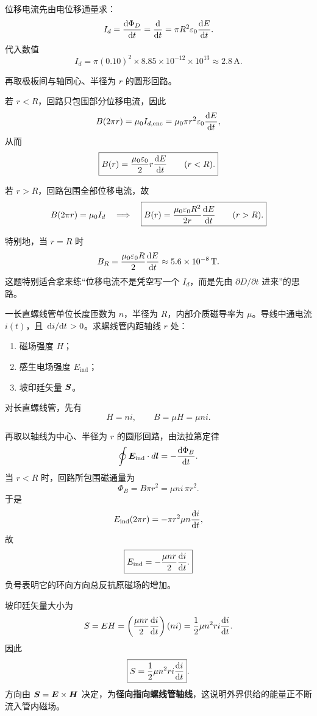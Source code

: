 \documentclass[lang=cn,11pt]{elegantbook}
\begin{document}
\begin{solution}
位移电流先由电位移通量求：
\[
I_d=\dv{\Phi_D}{t}=\dv{}{t}(D\pi R^2)
=\pi R^2\varepsilon_0\dv{E}{t}.
\]
代入数值
\[
I_d=\pi(0.10)^2\times 8.85\times 10^{-12}\times 10^{13}
\approx 2.8\,\mathrm{A}.
\]

再取极板间与轴同心、半径为 \(r\) 的圆形回路。

若 \(r<R\)，回路只包围部分位移电流，因此
\[
B(2\pi r)=\mu_0 I_{d,\mathrm{enc}}
=\mu_0\pi r^2\varepsilon_0\dv{E}{t},
\]
从而
\[
\boxed{
B(r)=\frac{\mu_0\varepsilon_0}{2}r\dv{E}{t}
\qquad (r<R).
}
\]

若 \(r>R\)，回路包围全部位移电流，故
\[
B(2\pi r)=\mu_0I_d
\quad\Longrightarrow\quad
\boxed{
B(r)=\frac{\mu_0\varepsilon_0R^2}{2r}\dv{E}{t}
\qquad (r>R).
}
\]

特别地，当 \(r=R\) 时
\[
B_R=\frac{\mu_0\varepsilon_0R}{2}\dv{E}{t}
\approx 5.6\times 10^{-8}\,\mathrm{T}.
\]
这题特别适合拿来练“位移电流不是凭空写一个 \(I_d\)，而是先由 \(\partial D/\partial t\) 进来”的思路。
\end{solution}

\begin{example}[电流随时间变化的螺线管内的感生电场与坡印廷矢量]
一长直螺线管单位长度匝数为 \(n\)，半径为 \(R\)，内部介质磁导率为 \(\mu\)。导线中通电流 \(i(t)\)，且 \(\dv*{i}{t}>0\)。求螺线管内距轴线 \(r\) 处：
\begin{enumerate}
  \item 磁场强度 \(H\)；
  \item 感生电场强度 \(E_{\mathrm{ind}}\)；
  \item 坡印廷矢量 \(\vb*{S}\)。
\end{enumerate}
\end{example}

\begin{solution}
对长直螺线管，先有
\[
H=ni,
\qquad
B=\mu H=\mu ni.
\]

再取以轴线为中心、半径为 \(r\) 的圆形回路，由法拉第定律
\[
\oint \vb*{E}_{\mathrm{ind}}\cdot d\vb*{l}
=-\dv{\Phi_B}{t}.
\]
当 \(r<R\) 时，回路所包围磁通量为
\[
\Phi_B=B\pi r^2=\mu ni\,\pi r^2.
\]
于是
\[
E_{\mathrm{ind}}(2\pi r)
=-\pi r^2\mu n\dv{i}{t},
\]
故
\[
\boxed{
E_{\mathrm{ind}}=-\frac{\mu nr}{2}\dv{i}{t}.
}
\]
负号表明它的环向方向总反抗原磁场的增加。

坡印廷矢量大小为
\[
S=EH
=\left(\frac{\mu nr}{2}\dv{i}{t}\right)(ni)
=\frac12\mu n^2ri\dv{i}{t}.
\]
因此
\[
\boxed{
S=\frac12\mu n^2ri\dv{i}{t}
}.
\]
方向由 \(\vb*{S}=\vb*{E}\times \vb*{H}\) 决定，为\textbf{径向指向螺线管轴线}，这说明外界供给的能量正不断流入管内磁场。
\end{solution}
\end{document}
